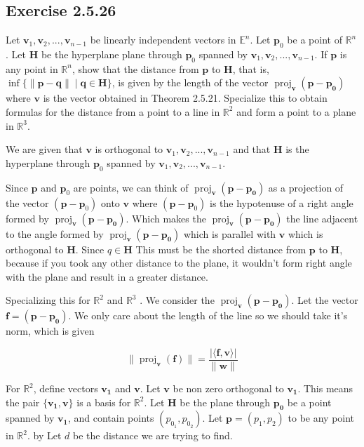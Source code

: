 \documentclass{tufte-book}
\DeclareMathOperator{\proj}{proj}
\newcommand{\vct}{\mathbf}
\newcommand{\dprod}[2]{\langle #1, #2 \rangle}
\theoremstyle{mytheoremstyle}
\theoremstyle{mylemstyle}
\theoremstyle{mydefstyle}
\begin{document}
\subsection{Exercise 2.5.26}
Let $\mathbf{v}_1,\mathbf{v}_2,...,\mathbf{v}_{n-1}$ be linearly independent vectors in $\mathbb{E}^n$. Let $\mathbf{p}_0$ be a point of $\mathbb{R}^n$.  Let $\mathbf{H}$ be the hyperplane plane through $\mathbf{p}_0$ spanned by $\mathbf{v}_1,\mathbf{v}_2,...,\mathbf{v}_{n-1}$. If $\mathbf{p}$ is any point in $\mathbb{R}^n$, show that the distance from $\mathbf{p}$ to $\mathbf{H}$, that is, $\inf\{\|\mathbf{p}-\mathbf{q}\| \mid \mathbf{q} \in \mathbf{H} \}$, is given by the length of the vector $\proj_\vct{v}(\vct{p} - \vct{p_0})$ where $\vct{v}$ is the vector obtained in Theorem 2.5.21. Specialize this to obtain formulas for the distance from a point to a line in $\mathbb{R}^2$ and form a point to a plane in $\mathbb{R}^3$.


We are given that $\vct{v}$ is orthogonal to $\vct{v}_1,\vct{v}_2,...,\vct{v}_{n-1}$ and that $\mathbf{H}$ is the hyperplane through $\vct{p}_0$ spanned by $\vct{v}_1,\vct{v}_2,...,\vct{v}_{n-1}$.

Since $\vct{p}$ and $\vct{p}_0$ are points, we can think of $\proj_\vct{v}(\vct{p} - \vct{p_0})$ as a projection of the vector $(\vct{p} - \vct{p}_0)$ onto $\vct{v}$ where $(\vct{p} - \vct{p}_0)$ is the hypotenuse of a right angle formed by $\proj_\vct{v}(\vct{p} - \vct{p_0})$. Which makes the $\proj_\vct{v}(\vct{p} - \vct{p_0})$ the line adjacent to the angle formed by $\proj_\vct{v}(\vct{p} - \vct{p_0})$  which is parallel with $\vct{v}$ which is orthogonal to $\mathbf{H}$.  Since $q \in \mathbf{H}$  This must be the shorted distance from $\vct{p}$ to $\mathbf{H}$, because if you took any other distance to the plane, it wouldn't form right angle with the plane and result in a greater distance.



Specializing this for $\mathbb{R}^2$ and $\mathbb{R}^3$ . We consider the $\proj_\vct{v}(\vct{p} - \vct{p_0})$.  Let the vector $\vct{f} = (\vct{p} - \vct{p_0})$.  We only care about the length of the line so we should take it's norm, which is given

\[ \|\proj_\vct{v}(\vct{f})\| = \frac{|\dprod{\vct{f}}{\vct{v}}|}{\|\vct{w}\|} \]

For $\mathbb{R}^2$, define vectors $\vct{v_1}$ and $\vct{v}$.  Let $\vct{v}$  be non zero orthogonal to $\vct{v_1}$.  This means the pair $\{\vct{v_1}, \vct{v}\}$ is a basis for $\mathbb{R}^2$.  Let $\mathbf{H}$ be the plane through $\vct{p_0}$ be a point spanned by $\vct{v_1}$, and contain points $(p_{0_1}, p_{0_2})$.  Let $\vct{p} = (p_1, p_2)$ to be any point in $\mathbb{R}^2$.  by Let $d$ be the distance we are trying to find.
\end{document}
